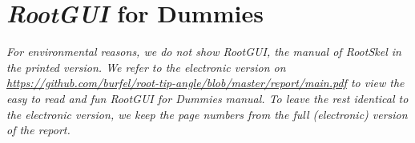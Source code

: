 %


\section{\textit{RootGUI} for Dummies}

\textit{For environmental reasons, we do not show \textit{RootGUI}, the manual of \textit{RootSkel} in the printed version. We refer to the electronic version on \url{https://github.com/burfel/root-tip-angle/blob/master/report/main.pdf} to view the easy to read and fun \textit{RootGUI} for Dummies manual. To leave the rest identical to the electronic version, we keep the page numbers from the full (electronic) version of the report.}

